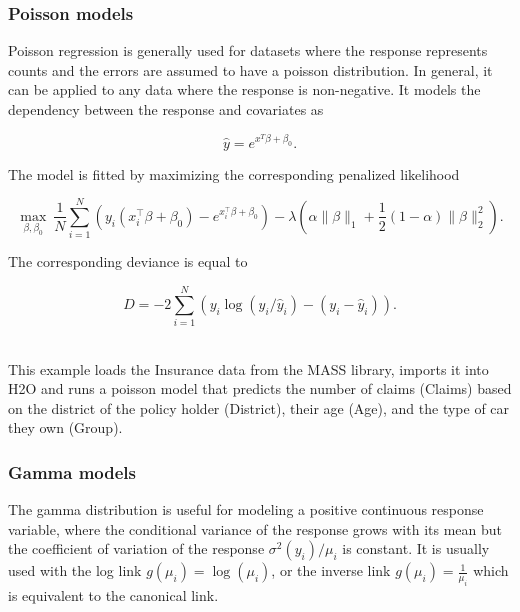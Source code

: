 

\waterExampleInPython


\subsubsection{Poisson models}
Poisson regression is generally used for datasets where the response represents counts and the errors are assumed to have a
poisson distribution. In general, it can be applied to any data where the response is non-negative. It models the dependency between the
response and covariates as

$$\hat{y} = e^{x^T\beta + \beta_0} .$$

The model is fitted by maximizing the corresponding penalized likelihood

$$  \max_{\beta,\beta_0}  \ \frac{1}{N} \sum_{i=1}^{N}  \left(   y_i (x_i^{\top}\beta  + \beta_0) - e^{x_i^{\top}\beta  + \beta_0} \right) 
- \lambda \left(\alpha \|\beta \|_1 + \frac{1}{2}(1-\alpha) \| \beta \|_2^2 \right). $$

The corresponding deviance is equal to 

$$D = -2\sum_{i=1}^{N} \left( y_i \log(y_i/\hat{y}_i) - ( y_i - \hat{y}_i  ) \right) .$$

\waterExampleInR
\\
This example loads the Insurance data from the MASS library, imports it into H2O and runs a poisson model that predicts the number of claims (Claims) based on the district of the policy holder (District), their age (Age), and the type of car they
own (Group).
\bigskip


\waterExampleInPython


\subsubsection{Gamma models}
The gamma distribution is useful for modeling a positive continuous response variable, where the conditional
variance of the response grows with its mean but the coefficient of variation of the response $\sigma^2(y_i)/\mu_i$ is
constant. It is usually used with the log link $g(\mu_i)= \log(\mu_i)$, or the inverse link $g(\mu_i) = \frac{1}{\mu_i} $ which is equivalent to the canonical link.

